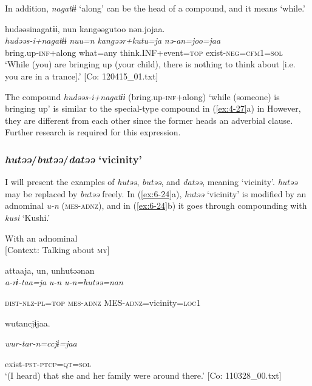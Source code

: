 In addition, \textit{nagatɨɨ} ‘along’ can be the head of a compound, and it means ‘while.’

\ea\label{ex:6-23}
{\TM}
\glll hudəəsinagatɨɨ,  nun  kangəəgutoo  nən.jojaa.\\
\textit{hudəəs-i+nagatɨɨ}  \textit{nuu=n}  \textit{kangəər+kutu=ja}  \textit{nə-an=joo=jaa}\\
    bring.up-\textsc{inf}+along  what=any  think.INF+event=\textsc{top}  exist-\textsc{neg}=\textsc{cfm}1=\textsc{sol}\\
\glt    ‘While (you) are bringing up (your child), there is nothing to think about [i.e. you are in a trance].’ [Co: 120415\_01.txt]
\z

The compound \textit{hudəəs-i+nagatɨɨ} (bring.up-\textsc{inf}+along) ‘while (someone) is bringing up’ is similar to the special-type compound in (\ref{ex:4-27}a) in  However, they are different from each other since the former heads an adverbial clause. Further research is required for this expression.

\subsubsection{\textit{hutəə}/\textit{butəə}/\textit{datəə} ‘vicinity’}

I will present the examples of \textit{hutəə}, \textit{butəə}, and \textit{datəə}, meaning ‘vicinity’. \textit{hutəə} may be replaced by \textit{butəə} freely. In (\ref{ex:6-24}a), \textit{hutəə} ‘vicinity’ is modified by an adnominal \textit{u-n} (\textsc{mes}-\textsc{adnz}), and in (\ref{ex:6-24}b) it goes through compounding with \textit{kusi} ‘Kushi.’

\ea\label{ex:6-24}
\ea With an adnominal\\{}
[Context: Talking about \textsc{my}]

{\TM}
\glll attaaja,  un,  unhutəənan\\

      \textit{a-rɨ-taa=ja}  \textit{u-n}  \textit{u-n=hutəə=nan}

      \textsc{dist}-\textsc{nlz}-\textsc{pl}=\textsc{top}  \textsc{mes}-\textsc{adnz}  MES-\textsc{adnz}=vicinity=\textsc{loc}1

      wutancjɨjaa.

      \textit{wur-tar-n=ccjɨ=jaa}

      exist-\textsc{pst}-\textsc{ptcp}=\textsc{qt}=\textsc{sol}\\
\glt ‘(I heard) that she and her family were around there.’ [Co: 110328\_00.txt]
\z

